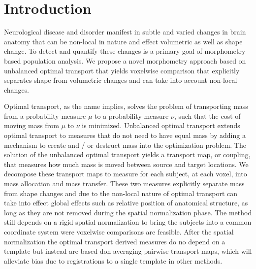\documentclass{llncs}
\begin{document}
\section{Introduction}
Neurological disease and disorder manifest in subtle and varied changes in
brain anatomy that can be non-local in nature and effect volumetric as well as
shape change. To detect and quantify these changes is a primary goal of
morphometry based population analysis. We propose a novel morphometry approach
based on unbalanced optimal transport that yields voxelwise comparison that
explicitly separates shape from volumetric changes and can take into account
non-local changes. 

Optimal transport, as the name implies, solves the problem of transporting mass
from a probability measure $\mu$ to a probability measure $\nu$, such that the
cost of moving mass from $\mu$ to $\nu$ is minimized. Unbalanced optimal
transport extends optimal transport to measures that do not need to have equal
mass by adding a mechanism to create and / or destruct mass into the
optimization problem. The solution of the unbalanced optimal transport yields a
transport map, or coupling, that measures how much mass is moved between source
and target locations. We decompose these transport maps to measure for each
subject, at each voxel, into mass allocation and mass transfer. These two
measures explicitly separate mass from shape changes and due to the non-local
nature of optimal transport can take into effect global effects such as
relative position of anatomical structure,  as long as they are not removed
during the spatial normalization phase. The method still depends on a rigid
spatial normalization to bring the subjects into a common coordinate system
were voxelwise comparisons are feasible. After the spatial normalization the
optimal transport derived measures do no depend on a template but instead are
based don averaging pairwise transport maps, which will alleviate bias due to
registrations to a single template  in other methods. 
\end{document}
